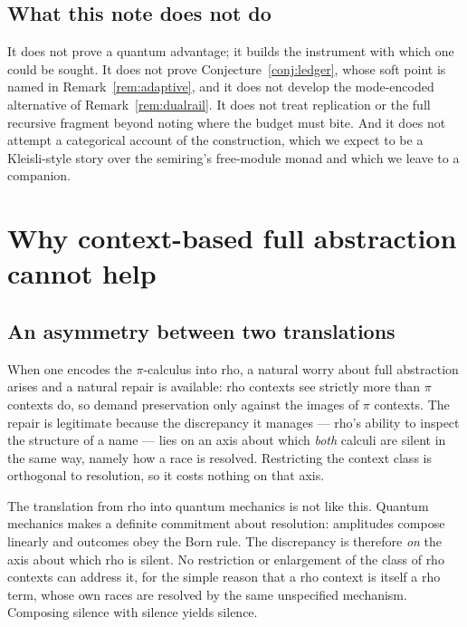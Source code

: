 \documentclass[11pt,a4paper]{article}
\theoremstyle{plain}
\theoremstyle{definition}
\theoremstyle{remark}
\begin{document}
\subsection{What this note does not do}

It does not prove a quantum advantage; it builds the instrument with which one
could be sought. It does not prove Conjecture~\ref{conj:ledger}, whose soft
point is named in Remark~\ref{rem:adaptive}, and it does not develop the
mode-encoded alternative of Remark~\ref{rem:dualrail}. It
does not treat replication or the full recursive fragment beyond noting where the
budget must bite. And it does not attempt a categorical account of the
construction, which we expect to be a Kleisli-style story over the semiring's
free-module monad and which we leave to a companion.

\section{Why context-based full abstraction cannot help}\label{sec:fa}

\subsection{An asymmetry between two translations}

When one encodes the $\pi$-calculus into rho, a natural worry about full
abstraction arises and a natural repair is available: rho contexts see strictly
more than $\pi$ contexts do, so demand preservation only against the images of
$\pi$ contexts. The repair is legitimate because the discrepancy it manages ---
rho's ability to inspect the structure of a name --- lies on an axis about which
\emph{both} calculi are silent in the same way, namely how a race is resolved.
Restricting the context class is orthogonal to resolution, so it costs nothing on
that axis.

The translation from rho into quantum mechanics is not like this. Quantum
mechanics makes a definite commitment about resolution: amplitudes compose
linearly and outcomes obey the Born rule. The discrepancy is therefore
\emph{on} the axis about which rho is silent. No restriction or enlargement of
the class of rho contexts can address it, for the simple reason that a rho
context is itself a rho term, whose own races are resolved by the same
unspecified mechanism. Composing silence with silence yields silence.
\end{document}

